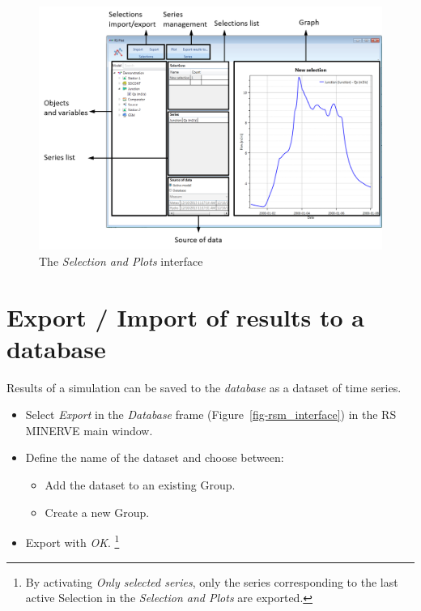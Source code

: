 \documentclass[
  letterpaper,
  DIV=11,
  numbers=noendperiod]{scrreprt}
\begin{document}
\begin{figure}

{\centering \includegraphics{./figures/fig-selection_plots_interface.png}

}

\caption{\label{fig-selection_plots_interface}The \emph{Selection and
Plots} interface}

\end{figure}

\hypertarget{export-import-of-results-to-a-database}{%
\chapter{Export / Import of results to a
database}\label{export-import-of-results-to-a-database}}

Results of a simulation can be saved to the \emph{database} as a dataset
of time series.

\begin{itemize}
\item
  {Select \emph{Export} in the \emph{Database} frame
  (Figure~\ref{fig-rsm_interface}) in the RS MINERVE main window.}
\item
  {Define the name of the dataset and choose between:}

  \begin{itemize}
  \item
    {Add the dataset to an existing Group.}
  \item
    {Create a new Group.}
  \end{itemize}
\item
  {Export with \emph{OK}. \footnote{By activating \emph{Only selected
    series}, only the series corresponding to the last active Selection
    in the \emph{Selection and Plots} are exported.}}
\end{itemize}
\end{document}
